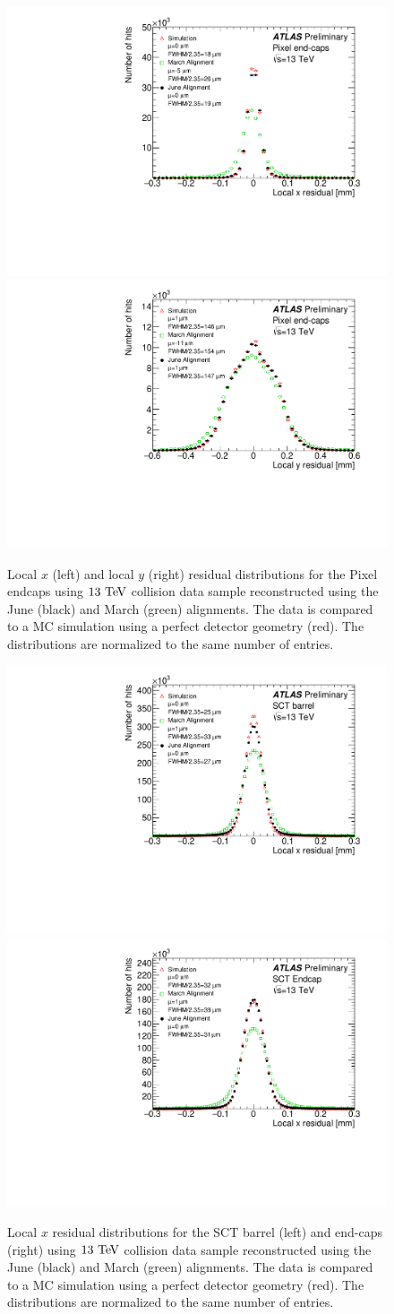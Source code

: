 \begin{figure}[htbp]
  \centering
  \includegraphics[width=.48\textwidth]{figs/alignment/align2015/PIXECX}
  \includegraphics[width=.48\textwidth]{figs/alignment/align2015/PIXECY}
  \caption{Local $x$ (left) and local $y$ (right) residual distributions for the Pixel endcaps using $13\tev$ collision data sample reconstructed using the June (black) and March (green) alignments.  The data is compared to a MC simulation using a perfect detector geometry (red).  The distributions are normalized to the same number of entries.}
  \label{fig:align_2015_results_pixec}
\end{figure}

\begin{figure}[htbp]
  \centering
  \includegraphics[width=.48\textwidth]{figs/alignment/align2015/SCTX}
  \includegraphics[width=.48\textwidth]{figs/alignment/align2015/SCTECX}
  \caption{Local $x$ residual distributions for the SCT barrel (left) and end-caps (right) using $13\tev$ collision data sample reconstructed using the June (black) and March (green) alignments.  The data is compared to a MC simulation using a perfect detector geometry (red).  The distributions are normalized to the same number of entries.}
  \label{fig:align_2015_results_sct}
\end{figure}

